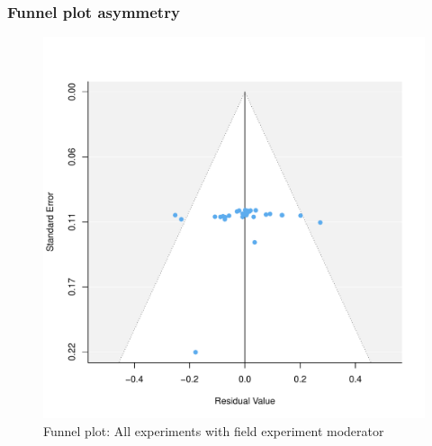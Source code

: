 \documentclass[usenames,dvipsnames]{beamer}
\begin{document}
\begin{frame}[label=supplemental, noframenumbering]
\frametitle{Funnel plot asymmetry \hyperlink{pub_bias}{}}

\begin{figure}[!hb]
\vspace*{-3mm}
\includegraphics[scale = 0.45]{../figs/funnel_all_mod.pdf}
\vspace{-0.2cm}
\caption{Funnel plot: All experiments with field experiment moderator}
\small
\vspace{-0.5cm}
\label{fig: funnel_all}
\end{figure}
\end{frame}

\end{document}
